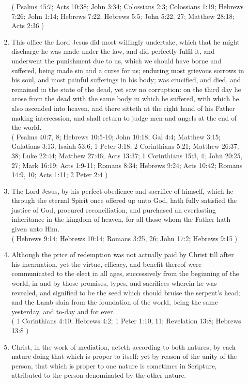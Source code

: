 \documentclass[12pt,a4paper]{book}
\begin{document}
\begin{enumerate}
( Psalms 45:7; Acts 10:38; John 3:34; Colossians 2:3; Colossians 1:19; Hebrews 7:26; John 1:14; Hebrews 7:22; Hebrews 5:5; John 5:22, 27; Matthew 28:18; Acts 2:36 )
\item This office the Lord Jesus did most willingly undertake, which that he might discharge he was made under the law, and did perfectly fulfil it, and underwent the punishment due to us, which we should have borne and suffered, being made sin and a curse for us; enduring most grievous sorrows in his soul, and most painful sufferings in his body; was crucified, and died, and remained in the state of the dead, yet saw no corruption: on the third day he arose from the dead with the same body in which he suffered, with which he also ascended into heaven, and there sitteth at the right hand of his Father making intercession, and shall return to judge men and angels at the end of the world.\\
( Psalms 40:7, 8; Hebrews 10:5-10; John 10:18; Gal 4:4; Matthew 3:15; Galatians 3:13; Isaiah 53:6; 1 Peter 3:18; 2 Corinthians 5:21; Matthew 26:37, 38; Luke 22:44; Matthew 27:46; Acts 13:37; 1 Corinthians 15:3, 4; John 20:25, 27; Mark 16:19; Acts 1:9-11; Romans 8:34; Hebrews 9:24; Acts 10:42; Romans 14:9, 10; Acts 1:11; 2 Peter 2:4 )
\item The Lord Jesus, by his perfect obedience and sacrifice of himself, which he through the eternal Spirit once offered up unto God, hath fully satisfied the justice of God, procured reconciliation, and purchased an everlasting inheritance in the kingdom of heaven, for all those whom the Father hath given unto Him.\\
( Hebrews 9:14; Hebrews 10:14; Romans 3:25, 26; John 17:2; Hebrews 9:15 )
\item Although the price of redemption was not actually paid by Christ till after his incarnation, yet the virtue, efficacy, and benefit thereof were communicated to the elect in all ages, successively from the beginning of the world, in and by those promises, types, and sacrifices wherein he was revealed, and signified to be the seed which should bruise the serpent's head; and the Lamb slain from the foundation of the world, being the same yesterday, and to-day and for ever.\\
( 1 Corinthians 4:10; Hebrews 4:2; 1 Peter 1:10, 11; Revelation 13:8; Hebrews 13:8 )
\item Christ, in the work of mediation, acteth according to both natures, by each nature doing that which is proper to itself; yet by reason of the unity of the person, that which is proper to one nature is sometimes in Scripture, attributed to the person denominated by the other nature.\\

\end{enumerate}
\end{document}
